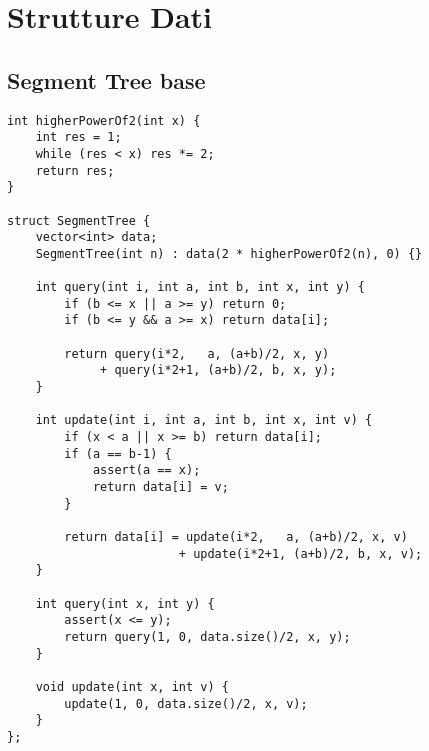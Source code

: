 \section{Strutture Dati}

\subsection{Segment Tree base}
\begin{lstlisting}
int higherPowerOf2(int x) {
    int res = 1;
    while (res < x) res *= 2;
    return res;
}

struct SegmentTree {
    vector<int> data;
    SegmentTree(int n) : data(2 * higherPowerOf2(n), 0) {}

    int query(int i, int a, int b, int x, int y) {
        if (b <= x || a >= y) return 0;
        if (b <= y && a >= x) return data[i];

        return query(i*2,   a, (a+b)/2, x, y)
             + query(i*2+1, (a+b)/2, b, x, y);
    }

    int update(int i, int a, int b, int x, int v) {
        if (x < a || x >= b) return data[i];
        if (a == b-1) {
            assert(a == x);
            return data[i] = v;
        }

        return data[i] = update(i*2,   a, (a+b)/2, x, v)
                        + update(i*2+1, (a+b)/2, b, x, v);
    }

    int query(int x, int y) {
        assert(x <= y);
        return query(1, 0, data.size()/2, x, y);
    }

    void update(int x, int v) {
        update(1, 0, data.size()/2, x, v);
    }
};
\end{lstlisting}

